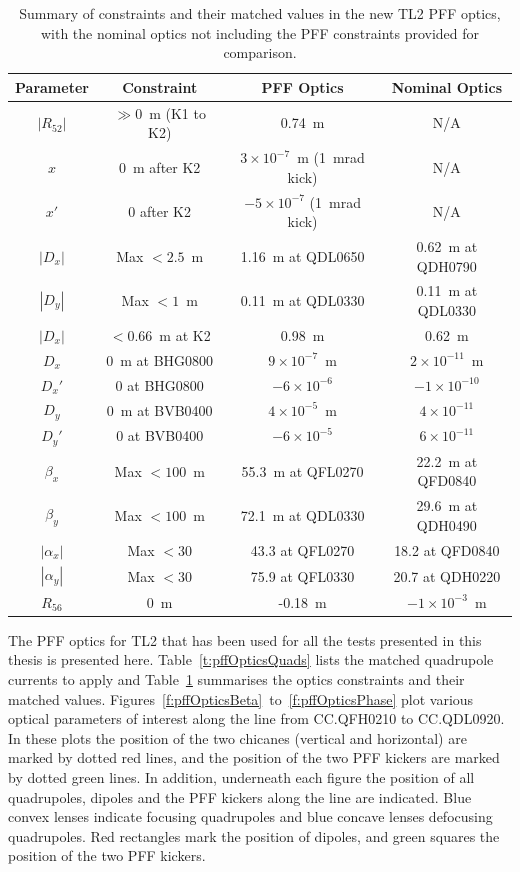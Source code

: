 \begin{table}
  \begin{center}
    \begin{tabular}{|c c c c|}
	   \hline
       Parameter & Constraint & PFF Optics & Nominal Optics \\ \hline
       \(|R_{52}|\) & \(\gg 0\)~m (K1 to K2) & 0.74~m & N/A \\
	   \(x\) & 0~m after K2 & \(3\times10^{-7}\)~m (1~mrad kick) & N/A \\
	   \(x'\) & 0 after K2 & \(-5\times10^{-7}\) (1~mrad kick) & N/A \\
	   \(|D_x|\) & Max \(<2.5\)~m & 1.16~m at QDL0650 & 0.62~m at QDH0790 \\
	   \(|D_y|\) & Max \(<1\)~m & 0.11~m at QDL0330 & 0.11~m at QDL0330\\
	   \(|D_x|\) & \(<0.66\)~m at K2 & 0.98~m & 0.62~m \\
	   \(D_x\) & 0~m at BHG0800 & \(9\times10^{-7}\)~m & \(2\times10^{-11}\)~m \\
	   \(D_x'\) & 0 at BHG0800 & \(-6\times10^{-6}\) & \(-1\times10^{-10}\) \\
	   \(D_y\) & 0~m at BVB0400 & \(4\times10^{-5}\)~m & \(4\times10^{-11}\) \\
	   \(D_y'\) & 0 at BVB0400 & \(-6\times10^{-5}\) & \(6\times10^{-11}\)\\
       \(\beta_x\) & Max \(<100\)~m & 55.3~m at QFL0270 & 22.2~m at QFD0840\\
	   \(\beta_y\) & Max \(<100\)~m & 72.1~m at QDL0330 & 29.6~m at QDH0490\\
	   \(|\alpha_x|\) & Max \(<30\) & 43.3 at QFL0270 & 18.2 at QFD0840\\
	   \(|\alpha_y|\) & Max \(<30\) & 75.9 at QFL0330 & 20.7 at QDH0220 \\
	   \(R_{56}\) & 0~m & -0.18~m & \(-1\times10^{-3}\)~m\\
	   \hline
    \end{tabular}
    \caption{Summary of constraints and their matched values in the new TL2 PFF optics, with the nominal optics not including the PFF constraints provided for comparison.}
  	\label{t:pffOpticsVals}
  \end{center}
\end{table}

The PFF optics for TL2 that has been used for all the tests presented in this thesis is presented here. Table~\ref{t:pffOpticsQuads} lists the matched quadrupole currents to apply and Table~\ref{t:pffOpticsVals} summarises the optics constraints and their matched values. Figures~\ref{f:pffOpticsBeta}~to~\ref{f:pffOpticsPhase} plot various optical parameters of interest along the line from CC.QFH0210 to CC.QDL0920. In these plots the position of the two chicanes (vertical and horizontal) are marked by dotted red lines, and the position of the two PFF kickers are marked by dotted green lines. In addition, underneath each figure the position of all quadrupoles, dipoles and the PFF kickers along the line are indicated. Blue convex lenses indicate focusing quadrupoles and blue concave lenses defocusing quadrupoles. Red rectangles mark the position of dipoles, and green squares the position of the two PFF kickers.

